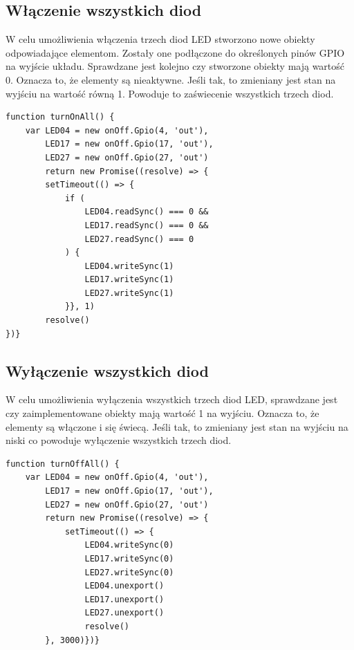 \subsection{Włączenie wszystkich diod}
W celu umożliwienia włączenia trzech diod LED stworzono nowe obiekty odpowiadające elementom. Zostały one podłączone do określonych pinów GPIO na wyjście układu. Sprawdzane jest kolejno czy stworzone obiekty mają wartość 0. Oznacza to, że elementy są nieaktywne. Jeśli tak, to zmieniany jest stan na wyjściu na wartość równą 1. Powoduje to zaświecenie wszystkich trzech diod.
\begin{lstlisting}[caption=Implementacja funkcji włączająca wszystkie diody]
function turnOnAll() {
    var LED04 = new onOff.Gpio(4, 'out'),
        LED17 = new onOff.Gpio(17, 'out'),
        LED27 = new onOff.Gpio(27, 'out')
        return new Promise((resolve) => {
        setTimeout(() => {
            if (
                LED04.readSync() === 0 &&
                LED17.readSync() === 0 &&
                LED27.readSync() === 0
            ) {
                LED04.writeSync(1)
                LED17.writeSync(1)
                LED27.writeSync(1)
            }}, 1)
        resolve()
})}
\end{lstlisting}

\subsection{Wyłączenie wszystkich diod}
W celu umożliwienia wyłączenia wszystkich trzech diod LED, sprawdzane jest czy zaimplementowane obiekty mają wartość 1 na wyjściu. Oznacza to, że elementy są włączone i się świecą. Jeśli tak, to zmieniany jest stan na wyjściu na niski co powoduje wyłączenie wszystkich trzech diod. 
\newpage
\begin{lstlisting}[caption=Implementacja funkcji wyłączająca wszystkie diody]
function turnOffAll() {
    var LED04 = new onOff.Gpio(4, 'out'),
        LED17 = new onOff.Gpio(17, 'out'),
        LED27 = new onOff.Gpio(27, 'out')
        return new Promise((resolve) => {
        	setTimeout(() => {
	            LED04.writeSync(0)
	            LED17.writeSync(0)
	            LED27.writeSync(0)
	            LED04.unexport()
	            LED17.unexport()
	            LED27.unexport()
	            resolve()
        }, 3000)})}
\end{lstlisting}

